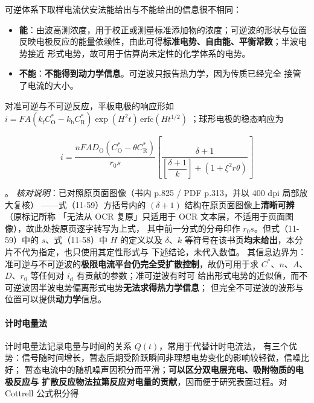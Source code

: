 可逆体系下取样电流伏安法能给出与不能给出的信息很不相同：

\begin{itemize}
\item \textbf{能}：由波高测浓度，用于校正或测量标准添加物的浓度；可逆波的形状与位置
  反映电极反应的能量依赖性，由此可得\textbf{标准电势、自由能、平衡常数}；半波电势接近
  形式电势，故可用于估算尚未定性的化学体系的电势。
\item \textbf{不能}：\textbf{不能得到动力学信息}。可逆波只报告热力学，因为传质已经完全
  接管了电流的大小。
\end{itemize}

对准可逆与不可逆反应，平板电极的响应形如
$i=FA\left(k_{\mathrm{f}}C_{\mathrm{O}}^*-k_{\mathrm{b}}C_{\mathrm{R}}^*\right)
\exp(H^2t)\,\mathrm{erfc}(Ht^{1/2})$
；球形电极的稳态响应为

\begin{equation}
i=\frac{nFAD_{\mathrm{O}}\left(C_{\mathrm{O}}^*-\theta C_{\mathrm{R}}^*\right)}{r_0 s}
\left[\frac{\delta+1}{\left[\dfrac{\delta+1}{k}\right]+(1+\xi^{2}r\theta)}\right]
\label{eq:sampled-sphere-irr}
\end{equation}

。
\emph{核对说明}：已对照原页面图像（书内 p.825 / PDF p.313，并以 400 dpi 局部放大复核）
——式（11-59）方括号内的 $(\delta+1)$ 结构在原页面图像上\textbf{清晰可辨}（原标记所称
「无法从 OCR 复原」只适用于 OCR 文本层，不适用于页面图像），故此处按原页逐字转写为上式，
其中前一分式的分母印作 $r_0 s$。但式（11-59）中的 $s$、式（11-58）中 $H$ 的定义以及
$\delta$、$k$ 等符号在该书页\textbf{均未给出}，本分片不代为指定，也只使用其定性形式与
下述结论，未代入数值。
其信息边界为：准可逆与不可逆波的\textbf{极限电流平台仍完全受扩散控制}，故仍可用于求
$C^*$、$n$、$A$、$D$、$r_0$ 等任何对 $i_{\mathrm{d}}$ 有贡献的参数；准可逆波有时可
给出形式电势的近似值，而不可逆波因半波电势偏离形式电势\textbf{无法求得热力学信息}；
但完全不可逆波的波形与位置可以提供\textbf{动力学}信息。

\paragraph{计时电量法} 计时电量法记录电量与时间的关系 $Q(t)$，常用于代替计时电流法，
有三个优势：信号随时间增长，暂态后期受阶跃瞬间非理想电势变化的影响较轻微，信噪比好；
暂态电流中的随机噪声因积分而平滑；\textbf{可以区分双电层充电、吸附物质的电极反应与
扩散反应物法拉第反应对电量的贡献}，因而便于研究表面过程。对 Cottrell 公式积分得

